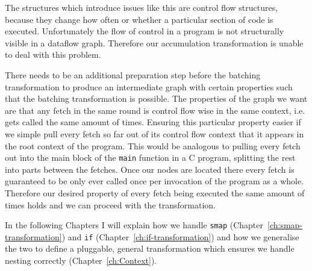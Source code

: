 The structures which introduce issues like this are control flow structures, because they change how often or whether a particular section of code is executed.
Unfortunately the flow of control in a program is not structurally visible in a dataflow graph.
Therefore our accumulation transformation is unable to deal with this problem.

There needs to be an additional preparation step before the batching transformation to produce an intermediate graph with certain properties such that the batching transformation is possible.
The properties of the graph we want are that any fetch in the same round is control flow wise in the same context, i.e. gets called the same amount of times.
Ensuring this particular property easier if we simple pull every fetch so far out of its control flow context that it appears in the root context of the program.
This would be analogous to pulling every fetch out into the main block of the \texttt{main} function in a C program, splitting the rest into parts between the fetches.
Once our nodes are located there every fetch is guaranteed to be only ever called once per invocation of the program as a whole.
Therefore our desired property of every fetch being executed the same amount of times holds and we can proceed with the transformation.

In the following Chapters I will explain how we handle \texttt{smap} (Chapter~\ref{ch:smap-transformation}) and \texttt{if} (Chapter~\ref{ch:if-transformation}) and how we generalise the two to define a pluggable, general transformation which ensures we handle nesting correctly (Chapter~\ref{ch:Context}).

